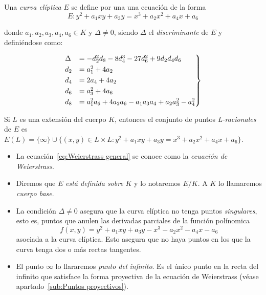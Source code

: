 \begin{definicion}
\label{def:curva elíptica}
	Una \emph{curva elíptica} $E$ se define por una una ecuación de la forma
	\begin{equation}
	\label{eq:Weierstrass general}
		E : y^2 + a_1 x y + a_3 y = x^3 + a_2 x^2 + a_4 x + a_6
	\end{equation}

	donde $a_1, a_2, a_3, a_4, a_6 \in K$ y $\Delta \neq 0$, siendo $\Delta$ el \emph{discriminante} de $E$ y definiéndose como:

	\begin{align}
		\label{eq:discriminante}
		\begin{rcases}
		\Delta & = -d_2^2 d_8 - 8 d_4^3 - 27 d_6^2 + 9 d_2 d_4 d_6         \\
		d_2    & = a_1^2 + 4 a_ 2                                          \\
		d_4    & = 2 a_4 + 4 a_2                                           \\
		d_6    & = a_3^2 + 4 a_6                                           \\
		d_8    & = a_1^2 a_6 + 4 a_2 a_6 - a_1 a_3 a_4 + a_2 a_3^2 - a_4^2 \\
		\end{rcases}
	\end{align}

	Si $L$ es una extensión del cuerpo $K$, entonces el conjunto de puntos \emph{L-racionales} de $E$ es $E(L) = \{\infty\} \cup \{(x, y) \in L \times L: y^2 + a_1 x y + a_3 y = x^3 + a_2 x^2 + a_4 x + a_6 \}$.
\end{definicion}

\begin{nota}\leavevmode
	\begin{itemize}
		\item La ecuación~\eqref{eq:Weierstrass general} se conoce como la \emph{ecuación de Weierstrass}.
		\item Diremos que $E$ \emph{está definida sobre} $K$ y lo notaremos $E/K$. A $K$ lo llamaremos \emph{cuerpo base}.
		\item La condición $\Delta \neq 0$ asegura que la curva elíptica no tenga puntos \emph{singulares}, esto es, puntos que anulen las derivadas parciales de la función polínomica
		$$
			f(x, y) = y^2 + a_1 x y + a_3 y - x^3 - a_2 x^2 - a_4 x - a_6
		$$
		asociada a la curva elíptica. Esto asegura que no haya puntos en los que la curva tenga dos o más rectas tangentes.
		\item El punto $\infty$ lo llararemos \emph{punto del infinito}. Es el único punto en la recta del infinito que satisface la forma proyectiva de la ecuación de Weierstrass (véase apartado~\ref{sub:Puntos proyectivos}).
	\end{itemize}
\end{nota}

